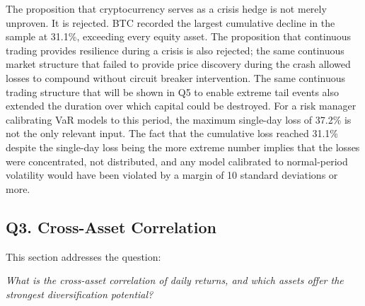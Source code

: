 The proposition that cryptocurrency serves as a crisis hedge is not merely unproven. It is rejected. BTC recorded the largest cumulative decline in the sample at 31.1\%, exceeding every equity asset. The proposition that continuous trading provides resilience during a crisis is also rejected; the same continuous market structure that failed to provide price discovery during the crash allowed losses to compound without circuit breaker intervention. The same continuous trading structure that will be shown in Q5 to enable extreme tail events also extended the duration over which capital could be destroyed. For a risk manager calibrating VaR models to this period, the maximum single-day loss of 37.2\% is not the only relevant input. The fact that the cumulative loss reached 31.1\% despite the single-day loss being the more extreme number implies that the losses were concentrated, not distributed, and any model calibrated to normal-period volatility would have been violated by a margin of 10 standard deviations or more.

\subsection{Q3. Cross-Asset Correlation}

This section addresses the question:

\noindent\textit{What is the cross-asset correlation of daily returns, and which assets offer the strongest diversification potential?}



